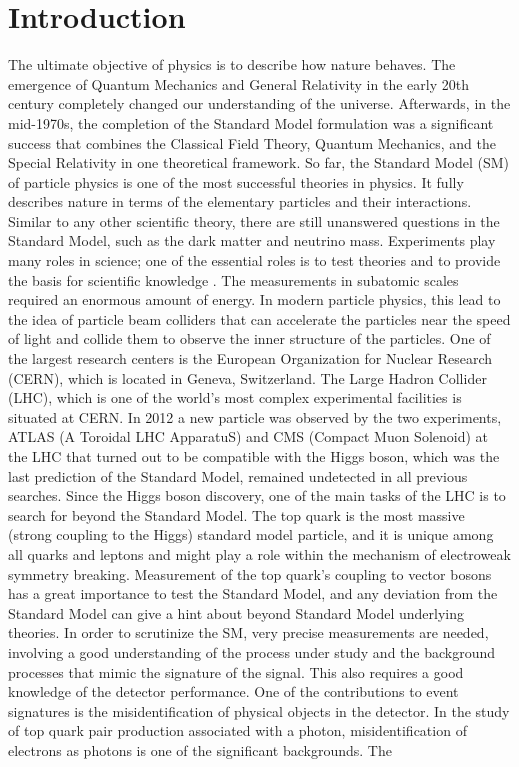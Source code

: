 
\chapter{Introduction} %

\label{Introduction} %

The ultimate objective of physics is to describe how nature behaves. The emergence of Quantum Mechanics and General Relativity in the early 20th century completely changed our understanding of the universe. Afterwards, in the mid-1970s, the completion of the Standard Model formulation was a significant success that combines the Classical Field Theory, Quantum Mechanics, and the Special Relativity in one theoretical framework. So far, the Standard Model (SM) of particle physics is one of the most successful theories in physics. It fully describes nature in terms of the elementary particles and their interactions. Similar to any other scientific theory, there are still unanswered questions in the Standard Model, such as the dark matter and neutrino mass. Experiments play many roles in science; one of the essential roles is to test theories and to provide the basis for scientific knowledge \cite{sep-physics-experiment}. The measurements in subatomic scales required an enormous amount of energy. In modern particle physics, this lead to the idea of particle beam colliders that can accelerate the particles near the speed of light and collide them to observe the inner structure of the particles. One of the largest research centers is the European Organization for Nuclear Research (CERN), which is located in Geneva, Switzerland. The Large Hadron Collider (LHC), which is one of the world's most complex experimental facilities is situated at CERN. In 2012 a new particle was observed by the two experiments, ATLAS (A Toroidal LHC ApparatuS) and CMS (Compact Muon Solenoid) at the LHC that turned out to be compatible with the Higgs boson, which was the last prediction of the Standard Model, remained undetected in all previous searches. Since the Higgs boson discovery, one of the main tasks of the LHC is to search for beyond the Standard Model. The top quark is the most massive (strong coupling to the Higgs) standard model particle, and it is unique among all quarks and leptons and might play a role within the mechanism of electroweak symmetry breaking. Measurement of the top quark's coupling to vector bosons has a great importance to test the Standard Model, and any deviation from the Standard Model can give a hint about beyond Standard Model underlying theories. In order to scrutinize the SM, very precise measurements are needed, involving a good understanding of the process under study and the background processes that mimic the signature of the signal. This also requires a good knowledge of the detector performance. One of the contributions to event signatures is the misidentification of physical objects in the detector. In the study of top quark pair production associated with a photon, misidentification of electrons as photons is one of the significant backgrounds. The 